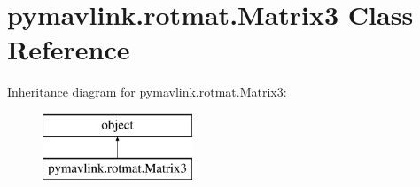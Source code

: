 \hypertarget{classpymavlink_1_1rotmat_1_1Matrix3}{}\section{pymavlink.\+rotmat.\+Matrix3 Class Reference}
\label{classpymavlink_1_1rotmat_1_1Matrix3}
Inheritance diagram for pymavlink.\+rotmat.\+Matrix3\+:\begin{figure}[H]
\begin{center}
\leavevmode
\includegraphics[height=2.000000cm]{classpymavlink_1_1rotmat_1_1Matrix3}
\end{center}
\end{figure}
